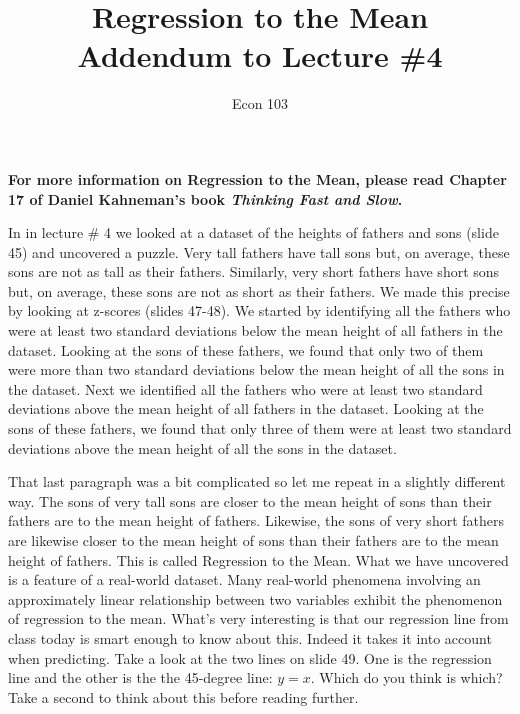 \documentclass[12pt]{article}
\title{Regression to the Mean\\ \large Addendum to Lecture \#4}
\author{Econ 103}
\begin{document}
\maketitle

\noindent\textbf{For more information on Regression to the Mean, please read Chapter 17 of Daniel Kahneman's book \emph{Thinking Fast and Slow}.}

\vspace{1em}

In in lecture \# 4 we looked at a dataset of the heights of fathers and sons (slide 45) and uncovered a puzzle.
Very tall fathers have tall sons but, on average, these sons are not as tall as their fathers.
Similarly, very short fathers have short sons but, on average, these sons are not as short as their fathers.
We made this precise by looking at z-scores (slides 47-48).
We started by identifying all the fathers who were at least two standard deviations below the mean height of all fathers in the dataset.
Looking at the sons of these fathers, we found that only two of them were more than two standard deviations below the mean height of all the sons in the dataset.
Next we identified all the fathers who were at least two standard deviations above the mean height of all fathers in the dataset.
Looking at the sons of these fathers, we found that only three of them were at least two standard deviations above the mean height of all the sons in the dataset.

That last paragraph was a bit complicated so let me repeat in a slightly different way.
The sons of very tall sons are closer to the mean height of sons than their fathers are to the mean height of fathers.
Likewise, the sons of very short fathers are likewise closer to the mean height of sons than their fathers are to the mean height of fathers.
This is called Regression to the Mean.
What we have uncovered is a feature of a real-world dataset.
Many real-world phenomena involving an approximately linear relationship between two variables exhibit the phenomenon of regression to the mean.
What's very interesting is that our regression line from class today is smart enough to know about this.
Indeed it takes it into account when predicting.
Take a look at the two lines on slide 49.
One is the regression line and the other is the the 45-degree line: $y=x$. Which do you think is which?
Take a second to think about this before reading further.
\end{document}
